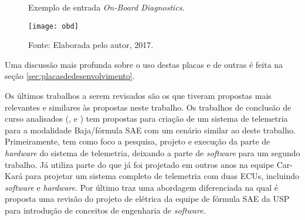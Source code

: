 \begin{figure}[!htb]
	\centering
		\caption{Exemplo de entrada \textit{On-Board Diagnostics}.}
		\texttt{[image: obd]} 
		\caption*{Fonte: Elaborada pelo autor, 2017.}
		\label{fig:obd}
\end{figure}

Uma discussão mais profunda sobre o uso destas placas e de outras é feita na seção \ref{sec:placasdedesenvolvimento}. 


Os últimos trabalhos a serem revisados são os que tiveram propostas mais relevantes e similares às propostas neste trabalho. Os trabalhos de conclusão de curso analisados (\cite{Dias2010}, \cite{Nunes2016} e \cite{Pereira2012}) tem propostas para criação de um sistema de telemetria para a modalidade Baja/fórmula SAE com um cenário similar ao deste trabalho. Primeiramente,  tem como foco a pesquisa, projeto e execução da parte de \textit{hardware} do sistema de telemetria, deixando a parte de \textit{software} para um segundo trabalho. Já  utiliza parte do que já foi projetado em outros anos na equipe Car-Kará para projetar um sistema completo de telemetria com duas ECUs, incluindo \textit{software} e \textit{hardware}. Por último  traz uma abordagem diferenciada na qual é proposta uma revisão do projeto de elétrica da equipe de fórmula SAE da USP para introdução de conceitos de engenharia de \textit{software}.

